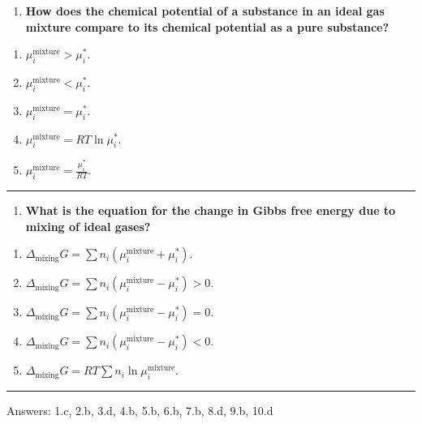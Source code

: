 \documentclass[
  9pt,
]{extbook}
\providecommand{\tightlist}{%
  \setlength{\itemsep}{0pt}\setlength{\parskip}{0pt}}
\theoremstyle{definition}
\theoremstyle{definition}
\theoremstyle{definition}
\theoremstyle{remark}
\begin{document}
\begin{enumerate}
\def\labelenumi{\arabic{enumi}.}
\setcounter{enumi}{8}
\tightlist
\item
  \textbf{How does the chemical potential of a substance in an ideal gas mixture compare to its chemical potential as a pure substance?}
\end{enumerate}

\begin{enumerate}
\def\labelenumi{\alph{enumi}.}
\tightlist
\item
  \(\mu_i^{\text{mixture}} > \mu_i^*\).
\item
  \(\mu_i^{\text{mixture}} < \mu_i^*\).
\item
  \(\mu_i^{\text{mixture}} = \mu_i^*\).
\item
  \(\mu_i^{\text{mixture}} = RT\ln\mu_i^*\).
\item
  \(\mu_i^{\text{mixture}} = \frac{\mu_i^*}{RT}\).
\end{enumerate}

\begin{center}\rule{0.5\linewidth}{0.5pt}\end{center}

\begin{enumerate}
\def\labelenumi{\arabic{enumi}.}
\setcounter{enumi}{9}
\tightlist
\item
  \textbf{What is the equation for the change in Gibbs free energy due to mixing of ideal gases?}
\end{enumerate}

\begin{enumerate}
\def\labelenumi{\alph{enumi}.}
\tightlist
\item
  \(\Delta_{\text{mixing}}G = \sum n_i(\mu_i^{\text{mixture}} + \mu_i^*)\).
\item
  \(\Delta_{\text{mixing}}G = \sum n_i(\mu_i^{\text{mixture}} - \mu_i^*) > 0\).
\item
  \(\Delta_{\text{mixing}}G = \sum n_i(\mu_i^{\text{mixture}} - \mu_i^*) = 0\).
\item
  \(\Delta_{\text{mixing}}G = \sum n_i(\mu_i^{\text{mixture}} - \mu_i^*) < 0\).
\item
  \(\Delta_{\text{mixing}}G = RT\sum n_i\ln\mu_i^{\text{mixture}}\).
\end{enumerate}

\begin{center}\rule{0.5\linewidth}{0.5pt}\end{center}

Answers: 1.c, 2.b, 3.d, 4.b, 5.b, 6.b, 7.b, 8.d, 9.b, 10.d
\end{document}
